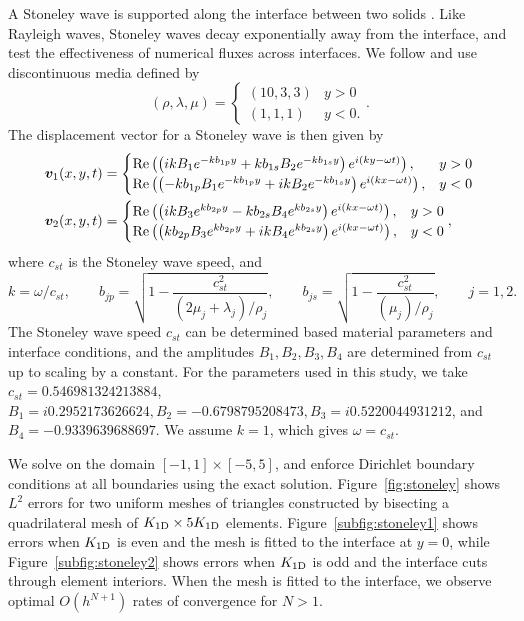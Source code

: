 \documentclass{siamart0216}
\newcommand{\LRp}[1]{\left( #1 \right)}
\begin{document}
A Stoneley wave is supported along the interface between two solids \cite{stoneley1924elastic}.  Like Rayleigh waves, Stoneley waves decay exponentially away from the interface, and test the effectiveness of numerical fluxes across interfaces.  We follow \cite{wilcox2010high,appelo2015energy} and use discontinuous media defined by
\[
(\rho,\lambda,\mu) = \begin{cases}
(10 ,3,3) & y > 0\\
(1,1,1) & y < 0.
\end{cases}.
\]
The displacement vector for a Stoneley wave is then given by
\begin{align*}
\bm{v}_1(x,y,t) &= \begin{cases}
{\rm Re}\LRp{\LRp{ikB_1e^{-kb_{1p}y} + kb_{1s}B_2 e^{-kb_{1s}y}}e^{i(ky-\omega t)}}, & y > 0\\
{\rm Re}\LRp{\LRp{-k b_{1p}B_1e^{-k b_{1p} y} + i kB_2e^{-kb_{1s}y}}e^{i(kx-\omega t)}}, & y < 0
\end{cases}\\
\bm{v}_2(x,y,t) &= \begin{cases}
{\rm Re}\LRp{\LRp{ikB_3 e^{k b_{2p} y} - kb_{2s}B_4 e^{k b_{2s}y }} e^{i(kx-\omega t)}}, & y > 0\\
{\rm Re}\LRp{\LRp{k b_{2p} B_3 e^{k b_{2p}y} + ikB_4 e^{k b_{2s}y}}e^{i(kx-\omega t)}}, & y < 0
\end{cases},
\end{align*}
where $c_{st}$ is the Stoneley wave speed, and 
\[
k = \omega/ c_{st}, \qquad b_{jp} = \sqrt{1 - \frac{c_{st}^2}{(2\mu_j + \lambda_j)/\rho_j}}, \qquad  b_{js} = \sqrt{1 - \frac{c_{st}^2}{(\mu_j)/\rho_j}}, \qquad j = 1,2.
\]
The Stoneley wave speed $c_{st}$ can be determined based material parameters and interface conditions, and the amplitudes $B_1,B_2,B_3,B_4$ are determined from $c_{st}$ up to scaling by a constant.  For the parameters used in this study, we take $c_{st} = 0.546981324213884$, $B_1 = i0.2952173626624, B_2 = -0.6798795208473, B_3 = i0.5220044931212$, and $B_4 = -0.9339639688697$.  We assume $k =1$, which gives $\omega=c_{st}$.  

We solve on the domain $[-1,1]\times [-5,5]$, and enforce Dirichlet boundary conditions at all boundaries using the exact solution.  Figure~\ref{fig:stoneley} shows $L^2$ errors for two uniform meshes of triangles constructed by bisecting a quadrilateral mesh of $K_{\rm 1D} \times 5K_{\rm 1D}$ elements. Figure~\ref{subfig:stoneley1} shows errors when $K_{\rm 1D}$ is even and the mesh is fitted to the interface at $y = 0$, while Figure~\ref{subfig:stoneley2} shows errors when $K_{\rm 1D}$ is odd and the interface cuts through element interiors.  When the mesh is fitted to the interface, we observe optimal $O(h^{N+1})$ rates of convergence for $N > 1$.  
\end{document}
